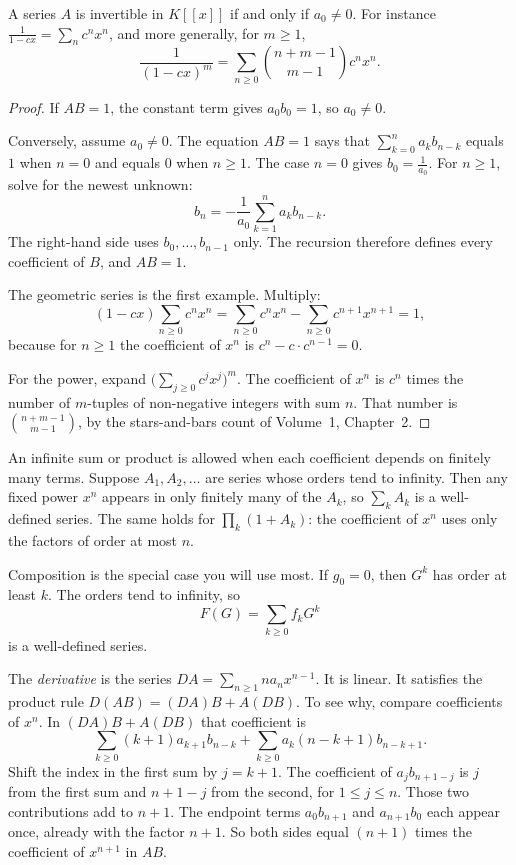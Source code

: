 \begin{proposition}\label{prop:inverse}
A series $A$ is invertible in $K[[x]]$ if and only if $a_0\ne0$. For instance $\frac1{1-cx}=\sum_nc^nx^n$, and more
generally, for $m\ge1$,
\[
\frac1{(1-cx)^m}=\sum_{n\ge0}\binom{n+m-1}{m-1}c^nx^n.
\]
\end{proposition}
\begin{proof}
If $AB=1$, the constant term gives $a_0b_0=1$, so $a_0\ne0$.

Conversely, assume $a_0\ne0$. The equation $AB=1$ says that $\sum_{k=0}^na_kb_{n-k}$ equals $1$ when $n=0$ and equals $0$ when $n\ge1$. The case $n=0$ gives $b_0=\frac1{a_0}$. For $n\ge1$, solve for the newest unknown:
\[
b_n=-\frac1{a_0}\sum_{k=1}^na_kb_{n-k}.
\]
The right-hand side uses $b_0,\dots,b_{n-1}$ only. The recursion therefore defines every coefficient of $B$, and $AB=1$.

The geometric series is the first example. Multiply:
\[
(1-cx)\sum_{n\ge0}c^nx^n=\sum_{n\ge0}c^nx^n-\sum_{n\ge0}c^{n+1}x^{n+1}=1,
\]
because for $n\ge1$ the coefficient of $x^n$ is $c^n-c\cdot c^{n-1}=0$.

For the power, expand $\bigl(\sum_{j\ge0}c^jx^j\bigr)^m$. The coefficient of $x^n$ is $c^n$ times the number of $m$-tuples of non-negative integers with sum $n$. That number is $\binom{n+m-1}{m-1}$, by the stars-and-bars count of Volume~1, Chapter~2.
\end{proof}

An infinite sum or product is allowed when each coefficient depends on finitely many terms. Suppose $A_1,A_2,\dots$ are series whose orders tend to infinity. Then any fixed power $x^n$ appears in only finitely many of the $A_k$, so $\sum_kA_k$ is a well-defined series. The same holds for $\prod_k(1+A_k)$: the coefficient of $x^n$ uses only the factors of order at most $n$.

Composition is the special case you will use most. If $g_0=0$, then $G^k$ has order at least $k$. The orders tend to infinity, so
\[
F(G)=\sum_{k\ge0}f_kG^k
\]
is a well-defined series.

The \emph{derivative} is the series $DA=\sum_{n\ge1}na_nx^{n-1}$. It is linear. It satisfies the product rule $D(AB)=(DA)B+A(DB)$. To see why, compare coefficients of $x^n$. In $(DA)B+A(DB)$ that coefficient is
\[
\sum_{k\ge0}(k+1)a_{k+1}b_{n-k}+\sum_{k\ge0}a_k(n-k+1)b_{n-k+1}.
\]
Shift the index in the first sum by $j=k+1$. The coefficient of $a_jb_{n+1-j}$ is $j$ from the first sum and $n+1-j$ from the second, for $1\le j\le n$. Those two contributions add to $n+1$. The endpoint terms $a_0b_{n+1}$ and $a_{n+1}b_0$ each appear once, already with the factor $n+1$. So both sides equal $(n+1)$ times the coefficient of $x^{n+1}$ in $AB$.


